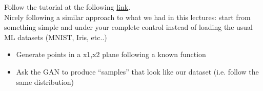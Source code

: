 Follow the tutorial at the following \href{https://machinelearningmastery.com/how-to-develop-a-generative-adversarial-network-for-a-1-dimensional-function-from-scratch-in-keras/}{link}.\\

Nicely following a similar approach to what we had in this lectures: start from something simple and under your complete control instead of loading the usual ML datasets (MNIST, Iris, etc..)

\begin{itemize}
	\item Generate points in a x1,x2 plane following a known function
	\item Ask the GAN to produce “samples” that look like our dataset (i.e. follow the same distribution)
\end{itemize}
